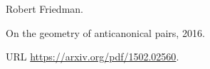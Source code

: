 Robert Friedman.

\newblock On the geometry of anticanonical pairs, 2016.

\newblock URL \url{https://arxiv.org/pdf/1502.02560}.

